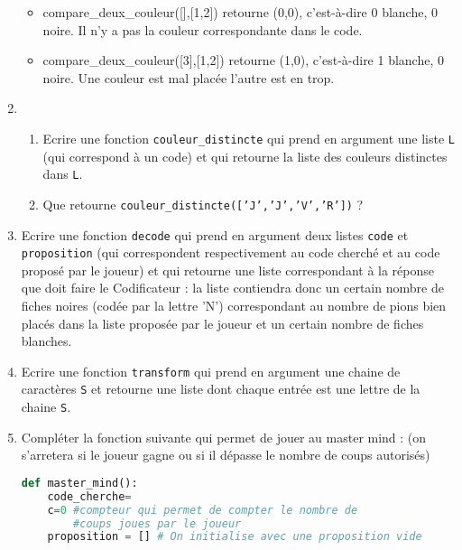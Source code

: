 \documentclass[a4paper, 11pt,reqno]{article}
\begin{document}
\begin{exercice}
\begin{enumerate}
\begin{itemize}
\item compare\_deux\_couleur([],[1,2]) 
retourne (0,0), c'est-à-dire 0 blanche, 0 noire. Il n'y a  pas la couleur correspondante dans le code.

\item compare\_deux\_couleur([3],[1,2]) 
retourne (1,0), c'est-à-dire 1 blanche, 0 noire. Une couleur est mal placée l'autre est en trop. 
\end{itemize}


\item 
\begin{enumerate}
\item Ecrire une fonction \texttt{couleur\_distincte} qui prend en argument une liste \texttt{L} (qui correspond à un code) et qui retourne la liste des couleurs distinctes dans \texttt{L}.
\item  Que retourne \texttt{couleur\_distincte(['J','J','V','R'])}  ?
\end{enumerate}

\item Ecrire une fonction \texttt{decode} qui prend en argument deux listes \texttt{code} et \texttt{proposition}  (qui correspondent respectivement au code cherché et au code proposé par le joueur) et qui retourne une liste  correspondant à  la réponse que doit faire le Codificateur : la liste contiendra donc un certain nombre de fiches noires (codée par la lettre 'N') correspondant au nombre de pions bien placés dans la liste proposée par le joueur et un certain nombre de fiches blanches.

\item Ecrire une fonction \texttt{transform} qui prend en argument une chaine de caractères \texttt{S} et retourne une liste dont chaque entrée est une lettre de la chaine \texttt{S}.

\item Compléter la fonction suivante qui permet de jouer au master mind :
(on s'arretera si le joueur gagne ou si il dépasse le nombre de coups autorisés) 
\begin{lstlisting}[language =python]
def master_mind():
    code_cherche=
    c=0 #compteur qui permet de compter le nombre de 
    	#coups joues par le joueur
    proposition = [] # On initialise avec une proposition vide
    

\end{lstlisting}
\end{enumerate}
\end{exercice}
\end{document}
